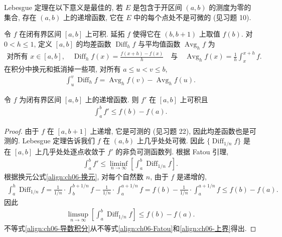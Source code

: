 \documentclass[../../main.tex]{subfiles}
\begin{document}
Lebesgue 定理在以下意义是最佳的, 若 $E$ 是包含于开区间 $(a,b)$ 的测度为零的集合, 存在 $(a,b)$ 上的递增函数, 它在 $E$ 中的每个点处不是可微的 (见习题 10).

令 $f$ 在闭有界区间 $[a,b]$ 上可积. 延拓 $f$ 使得它在 $(b,b+1)$ 上取值 $f(b)$. 对 $0<h\leqslant 1$, 定义 $[a,b]$ 的均差函数 $\operatorname{Diff}_{h}f$ 与平均值函数 $\operatorname{Avg}_{h}f$ 为
\begin{align*}
\text{对所有 }x\in[a,b],\quad\operatorname{Diff}_{h}f(x)=\frac{f(x+h)-f(x)}{h}\quad\text{与}\quad\operatorname{Avg}_{h}f(x)=\frac{1}{h}\int_{x}^{x+h}f.
\end{align*}
在积分中换元和抵消掉一些项, 对所有 $a\leqslant u<v\leqslant b$,
\begin{align}
\int_{u}^{v}\operatorname{Diff}_{h}f=\operatorname{Avg}_{h}f(v)-\operatorname{Avg}_{h}f(u).\label{align:ch06-换元}
\end{align}

\begin{corollary}\label{corollary:ch06-单调导数可积}
令 $f$ 为闭有界区间 $[a,b]$ 上的递增函数. 则 $f'$ 在 $[a,b]$ 上可积且
\begin{align}
\int_{a}^{b}f'\leqslant f(b)-f(a).\label{align:ch06-导数积分}
\end{align}
\end{corollary}

\begin{proof}
由于 $f$ 在 $[a,b+1]$ 上递增, 它是可测的 (见习题 22), 因此均差函数也是可测的. Lebesgue 定理告诉我们 $f$ 在 $(a,b)$ 上几乎处处可微. 因此 $\{\operatorname{Diff}_{1/n}f\}$ 是在 $[a,b]$ 上几乎处处逐点收敛于 $f'$ 的非负可测函数列. 根据 Fatou 引理,
\begin{align}
\int_{a}^{b}f'\leqslant\liminf_{n\to\infty}\left[\int_{a}^{b}\operatorname{Diff}_{1/n}f\right].\label{align:ch06-Fatou}
\end{align}
根据换元公式\eqref{align:ch06-换元}, 对每个自然数 $n$, 由于 $f$ 是递增的,
\begin{align*}
\int_{a}^{h}\operatorname{Diff}_{1/n}f=\frac{1}{1/n}\cdot\int_{b}^{b+1/n}f-\frac{1}{1/n}\cdot\int_{a}^{a+1/n}f=f(b)-\frac{1}{1/n}\cdot\int_{a}^{a+1/n}f\leqslant f(b)-f(a).
\end{align*}
因此
\begin{align}
\limsup_{n\to\infty}\left[\int_{a}^{b}\operatorname{Diff}_{1/n}f\right]\leqslant f(b)-f(a).\label{align:ch06-上界}
\end{align}
不等式\eqref{align:ch06-导数积分}从不等式\eqref{align:ch06-Fatou}和\eqref{align:ch06-上界}得出.
\end{proof}
\end{document}
